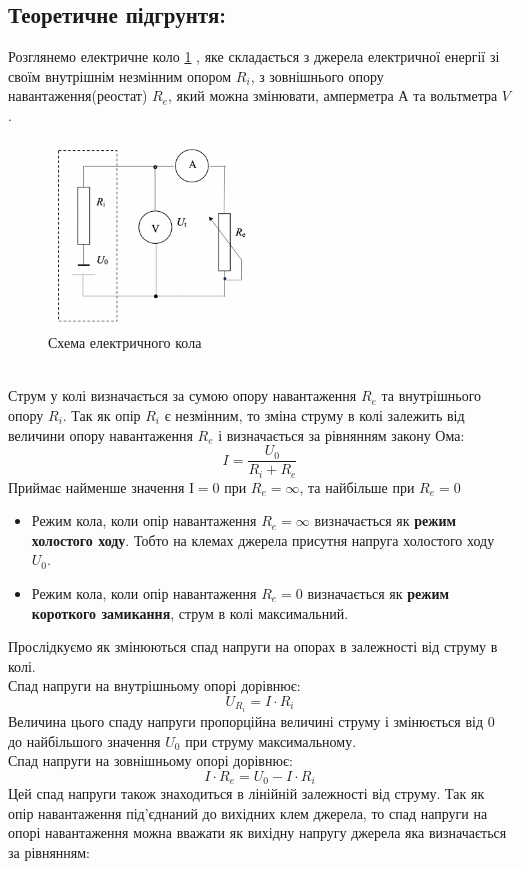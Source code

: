 \documentclass[a4paper,12pt]{article}
\begin{document}
\begin{justify}
	\subsection{Теоретичне підгрунтя:}
	Розглянемо електричне коло \figurename{\ref{fig:1}} , яке складається з джерела електричної енергії зі своїм внутрішнім незмінним опором $R_i$, з зовнішнього опору навантаження(реостат) $R_e$, який можна змінювати, амперметра $А$ та вольтметра $V$.
	\begin{figure}[!h]
		\centering
		\includegraphics[height=50mm]{media/graph1.png}
		\caption{Схема електричного кола}
		\label{fig:1}
	\end{figure}\\
	Струм у колі визначається за сумою опору навантаження $R_e$ та внутрішнього опору $R_i$. Так як опір $R_i$ є незмінним, то зміна струму в колі залежить від величини опору навантаження $R_e$ і визначається за рівнянням закону Ома: $$I=\dfrac{U_0}{R_i+R_e}$$
	Приймає найменше значення $І = 0$ при $R_e = \infty$, та найбільше при $R_e=0$
	\begin{itemize}
		\item Режим кола, коли опір навантаження $R_e=\infty$ визначається як \textbf{режим холостого ходу}. Тобто на клемах джерела присутня напруга холостого ходу $U_0$.
		\item Режим кола, коли опір навантаження $R_e= 0$ визначається як \textbf{режим короткого замикання}, струм в колі максимальний.
	\end{itemize}\newpage
	Прослідкуємо як змінюються спад напруги на опорах в залежності від струму в колі.\\ 
	Спад напруги на внутрішньому опорі дорівнює:
	$$U_{R_i}=I\cdot R_i$$
	Величина цього спаду напруги пропорційна величині струму і змінюється від 0 до найбільшого значення $U_0$ при струму максимальному.\\
	Спад напруги на зовнішньому опорі дорівнює:
	$$I\cdot R_e=U_0-I\cdot R_i$$
	Цей спад напруги також знаходиться в лінійній залежності від струму. Так як опір навантаження під’єднаний до вихідних клем джерела, то спад напруги на опорі навантаження можна вважати як вихідну напругу джерела яка визначається за рівнянням:

\end{justify}
\end{document}
